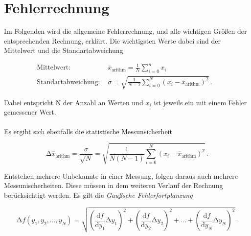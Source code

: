 \section{Fehlerrechnung}
\label{sec:Fehlerrechnung}

Im Folgenden wird die allgemeine Fehlerrechnung, und alle wichtigen Größen der entsprechenden Rechnung, erklärt.
Die wichtigsten Werte dabei sind der Mittelwert und die Standartabweichung

\begin{align}
    \text{Mittelwert:} & \stackrel{_{-}}{x}_{\text{arithm}}  = \frac{1}{N} \sum_{i=0}^{n} x_i & \\
    \text{Standartabweichung: } & \sigma  = \sqrt{\frac{1}{N - 1 } \sum_{i=0}^{N} (x_i -  \stackrel{_{-}}{x}_{\text{arithm}})^2} \, .
\end{align}

Dabei entspricht N der Anzahl an Werten und $x_i$ ist jeweils ein mit einem Fehler gemessener Wert.\\
\\
Es ergibt sich ebenfalls die statistische Messunsicherheit

\begin{equation}
    \increment \stackrel{_{-}}{x}_{\text{arithm}} = \frac{\sigma}{\sqrt{N}} = 
    \sqrt{\frac{1}{N(N - 1)} \sum_{i=0}^{N} (x_i -  \stackrel{_{-}}{x}_{\text{arithm}})^2} \, .
\end{equation} 

Entstehen mehrere Unbekannte in einer Messung, folgen daraus auch mehrere Messunischerheiten.
Diese müssen in dem weiteren Verlauf der Rechnung berücksichtigt werden.
Es gilt die \textit{Gaußsche Fehlerfortplanzung}

\begin{equation}
    \increment f(y_1 ,y_2 ,...,y_N ) = \sqrt{\left(\frac{\text{d} f}{\text{d} y_{1}} \increment y_{1}\right)^2
    + \left(\frac{\text{d} f}{\text{d} y_{2}} \increment y_{2}\right)^2 + ... + 
    \left(\frac{\text{d} f}{\text{d} y_{N}} \increment y_{N}\right)^2
    } \, .
\end{equation}